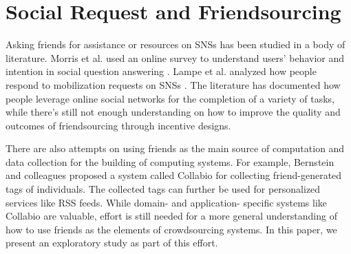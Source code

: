 \section{Social Request and Friendsourcing}

Asking friends for assistance or resources on SNSs has been studied in a body of literature. 
Morris et al. used an online survey to understand users' behavior and intention in social question answering \cite{Morris:CHI10:QABehavior}. 
Lampe et al. analyzed how people respond to mobilization requests on SNSs \cite{Lampe:CSCW14:HelpOnWay}. 
The literature has documented how people leverage online social networks for the completion of a variety of tasks, 
while there's still not enough understanding on how to improve the quality and outcomes of friendsourcing through incentive designs.

There are also attempts on using friends as the main source of computation and data collection for the building of computing systems. 
For example, Bernstein and colleagues \cite{Bernstein:TOCHI10:Collabio} 
proposed a system called Collabio for collecting friend-generated tags of individuals. 
The collected tags can further be used for personalized services like RSS feeds. 
While domain- and application- specific systems like Collabio are valuable, 
effort is still needed for a more general understanding of how to use friends as the elements of crowdsourcing systems. 
In this paper, we present an exploratory study as part of this effort.



